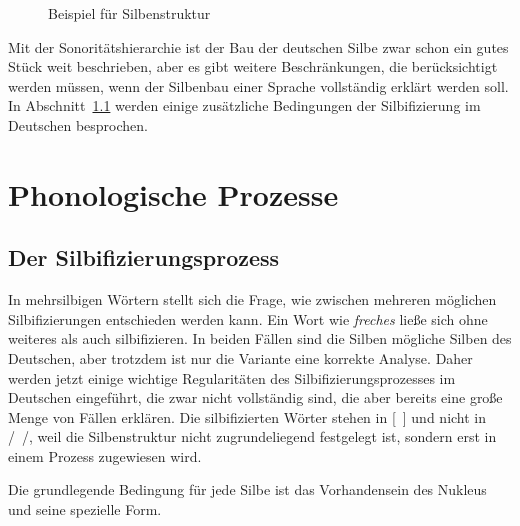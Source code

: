 \begin{figure}[!h]
  \centering
  \caption{Beispiel für Silbenstruktur}
  \label{fig:phonstr}
\end{figure}

Mit der Sonoritätshierarchie ist der Bau der deutschen Silbe zwar schon ein gutes Stück weit beschrieben, aber es gibt weitere Beschränkungen, die berücksichtigt werden müssen, wenn der Silbenbau einer Sprache vollständig erklärt werden soll.
In Abschnitt~\ref{sec:silbifizierung} werden einige zusätzliche Bedingungen der Silbifizierung im Deutschen besprochen.

\section{Phonologische Prozesse}

\label{sec:phonologischeprozesse}

\subsection{Der Silbifizierungsprozess}

\label{sec:silbifizierung}

In mehrsilbigen Wörtern stellt sich die Frage, wie zwischen mehreren möglichen Silbifizierungen entschieden werden kann.
Ein Wort wie \textit{freches} ließe sich ohne weiteres \textipa{[fKE.\c{c}@s]} als auch \textipa{[fKE\c{c}.@s]} silbifizieren.
In beiden Fällen sind die Silben mögliche Silben des Deutschen, aber trotzdem ist nur die Variante \textipa{[fKE.\c{c}@s]} eine korrekte Analyse.
Daher werden jetzt einige wichtige Regularitäten des Silbifizierungsprozesses im Deutschen eingeführt, die zwar nicht vollständig sind, die aber bereits eine große Menge von Fällen erklären.
Die silbifizierten Wörter stehen in [~] und nicht in /~/, weil die Silbenstruktur nicht zugrundeliegend festgelegt ist, sondern erst in einem Prozess zugewiesen wird.

Die grundlegende Bedingung für jede Silbe ist das Vorhandensein des Nukleus und seine spezielle Form.


